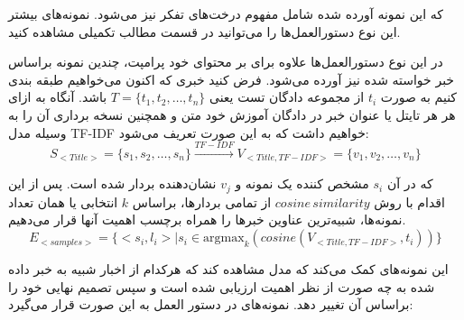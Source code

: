 که این نمونه آورده شده شامل مفهوم درخت‌های تفکر نیز می‌شود. نمونه‌های بیشتر این نوع دستورالعمل‌ها را می‌توانید در قسمت مطالب تکمیلی مشاهده کنید.

در این نوع دستورالعمل‌ها علاوه برای بر محتوای خود پرامپت، چندین نمونه براساس خبر خواسته شده نیز آورده می‌شود. فرض کنید خبری که اکنون می‌خواهیم طبقه بندی کنیم به صورت
$t_i$
از مجموعه دادگان تست یعنی
$T = \{t_1, t_2, \ldots, t_n\}$
باشد. آنگاه به ازای هر هر تایتل یا عنوان خبر در دادگان آموزش خود متن و همچنین نسخه برداری آن را به وسیله مدل TF-IDF خواهیم داشت که به این صورت تعریف می‌شود:
\begin{equation}
    S_{<Title>} = \{s_1, s_2, \ldots, s_n\} \xrightarrow{TF-IDF} V_{<Title, TF-IDF>} = \{v_1, v_2, \ldots, v_n\}
\end{equation}

که در آن
$s_i$
مشخص کننده یک نمونه و 
$v_j$
نشان‌دهنده بردار شده است. پس از این اقدام با روش
$cosine\,similarity$
از تمامی بردار‌ها، براساس
$k$
انتخابی یا همان تعداد نمونه‌ها، شبیه‌ترین عناوین خبرها را همراه برچسب اهمیت‌ آنها قرار می‌دهیم.
\begin{equation}
    E_{<samples>} = \{<s_i, l_i> | s_i \in \text{argmax}_{k}\left(cosine(V_{<Title, TF-IDF>}, t_i)\right)\}
\end{equation}

این نمونه‌های کمک می‌کند که مدل‌ مشاهده کند که هرکدام از اخبار شبیه به خبر داده شده به چه صورت از نظر اهمیت ارزیابی شده است و سپس تصمیم‌ نهایی خود را براساس آن تغییر دهد. نمونه‌های در دستور العمل به این صورت قرار می‌گیرد:

